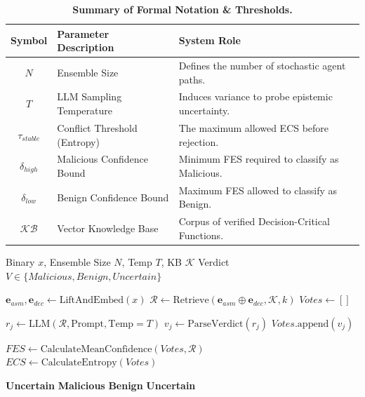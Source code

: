 \documentclass[pdflatex,sn-mathphys-num]{sn-jnl}
\newcommand{\sysname}{\texttt{MAGMA}~}
\begin{document}
\begin{table}[h]
\centering
\caption{\textbf{Summary of Formal Notation \& Thresholds.}}
\label{tab:notation}
\begin{tabular}{c|l|l}
\toprule
\textbf{Symbol} & \textbf{Parameter Description} & \textbf{System Role} \\
\midrule
$N$ & Ensemble Size & Defines the number of stochastic agent paths. \\
$T$ & LLM Sampling Temperature & Induces variance to probe epistemic uncertainty. \\
$\tau_{stable}$ & Conflict Threshold (Entropy) & The maximum allowed ECS before rejection. \\
$\delta_{high}$ & Malicious Confidence Bound & Minimum FES required to classify as Malicious. \\
$\delta_{low}$ & Benign Confidence Bound & Maximum FES allowed to classify as Benign. \\
$\mathcal{KB}$ & Vector Knowledge Base & Corpus of verified Decision-Critical Functions. \\
\bottomrule
\end{tabular}%
\end{table}

\begin{algorithm}[t]
\caption{\sysname Inference Protocol}
\label{alg:inference}
\begin{algorithmic}[1]
\Require Binary $x$, Ensemble Size $N$, Temp $T$, KB $\mathcal{K}$
\Ensure Verdict $V \in \{Malicious, Benign, Uncertain\}$

\State $\mathbf{e}_{asm}, \mathbf{e}_{dec} \leftarrow \text{LiftAndEmbed}(x)$
\State $\mathcal{R} \leftarrow \text{Retrieve}(\mathbf{e}_{asm} \oplus \mathbf{e}_{dec}, \mathcal{K}, k)$
\State $Votes \leftarrow []$

    \State $r_j \leftarrow \text{LLM}(\mathcal{R}, \text{Prompt}, \text{Temp}=T)$
    \State $v_j \leftarrow \text{ParseVerdict}(r_j)$
    \State $Votes.\text{append}(v_j)$
\EndFor

\State $FES \leftarrow \text{CalculateMeanConfidence}(Votes, \mathcal{R})$
\State $ECS \leftarrow \text{CalculateEntropy}(Votes)$

    \Return \textbf{Uncertain}
    \Return \textbf{Malicious}
    \Return \textbf{Benign}
\Else
    \Return \textbf{Uncertain}
\EndIf
\end{algorithmic}
\end{algorithm}
\end{document}
